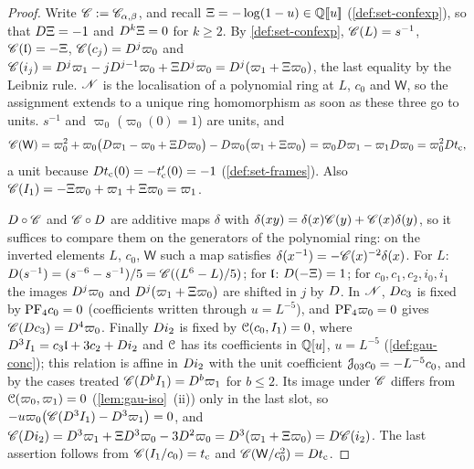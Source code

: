 \begin{proof}
Write $\mathscr{C}:=\mathscr{C}_{\alpha,\beta}$, and recall $\Xi=-\log(1-u)\in\mathbb{Q}[\![ u ]\!]$ (\cref{def:set-confexp}), so that $D\Xi=-1$ and $D^k\Xi=0$ for $k\geq2$. By \cref{def:set-confexp}, $\mathscr{C}(L)=s^{-1}$, $\mathscr{C}(\mathfrak{l})=-\Xi$, $\mathscr{C}(c_j)=D^j\varpi_0$ and $\mathscr{C}(i_j)=D^j\varpi_1-jD^{j-1}\varpi_0+\Xi D^j\varpi_0=D^j(\varpi_1+\Xi\varpi_0)$, the last equality by the Leibniz rule. $\mathscr{N}$ is the localisation of a polynomial ring at $L$, $c_0$ and $\mathsf W$, so the assignment extends to a unique ring homomorphism as soon as these three go to units. $s^{-1}$ and $\varpi_0$ ($\varpi_0(0)=1$) are units, and
\[
\mathscr{C}(\mathsf W)=\varpi_0^2+\varpi_0\bigl(D\varpi_1-\varpi_0+\Xi D\varpi_0\bigr)-D\varpi_0\bigl(\varpi_1+\Xi\varpi_0\bigr)=\varpi_0D\varpi_1-\varpi_1D\varpi_0=\varpi_0^2Dt_{\mathrm{c}},
\]
a unit because $Dt_{\mathrm{c}}(0)=-t_{\mathrm{c}}'(0)=-1$ (\cref{def:set-frames}). Also $\mathscr{C}(I_1)=-\Xi\varpi_0+\varpi_1+\Xi\varpi_0=\varpi_1$.

$D\circ\mathscr{C}$ and $\mathscr{C}\circ D$ are additive maps $\delta$ with $\delta(xy)=\delta(x)\mathscr{C}(y)+\mathscr{C}(x)\delta(y)$, so it suffices to compare them on the generators of the polynomial ring: on the inverted elements $L$, $c_0$, $\mathsf W$ such a map satisfies $\delta(x^{-1})=-\mathscr{C}(x)^{-2}\delta(x)$. For $L$: $D(s^{-1})=(s^{-6}-s^{-1})/5=\mathscr{C}((L^6-L)/5)$; for $\mathfrak{l}$: $D(-\Xi)=1$; for $c_0,c_1,c_2,i_0,i_1$ the images $D^j\varpi_0$ and $D^j(\varpi_1+\Xi\varpi_0)$ are shifted in $j$ by $D$. In $\mathscr{N}$, $D c_3$ is fixed by $\mathrm{PF}_{4} c_0=0$ (coefficients written through $u=L^{-5}$), and $\mathrm{PF}_{4}\varpi_0=0$ gives $\mathscr{C}(D c_3)=D^4\varpi_0$. Finally $D i_2$ is fixed by $\mathcal{C}(c_0,I_1)=0$, where $D^3I_1=c_3\mathfrak{l}+3c_2+D i_2$ and $\mathcal{C}$ has its coefficients in $\mathbb{Q}[u]$, $u=L^{-5}$ (\cref{def:gau-conc}); this relation is affine in $D i_2$ with the unit coefficient $\mathcal{J}_{03}c_0=-L^{-5}c_0$, and by the cases treated $\mathscr{C}(D^bI_1)=D^b\varpi_1$ for $b\leq2$. Its image under $\mathscr{C}$ differs from $\mathcal{C}(\varpi_0,\varpi_1)=0$ (\cref{lem:gau-iso}~(ii)) only in the last slot, so $-u\varpi_0\bigl(\mathscr{C}(D^3I_1)-D^3\varpi_1\bigr)=0$, and $\mathscr{C}(D i_2)=D^3\varpi_1+\Xi D^3\varpi_0-3D^2\varpi_0=D^3(\varpi_1+\Xi\varpi_0)=D\mathscr{C}(i_2)$. The last assertion follows from $\mathscr{C}(I_1/c_0)=t_{\mathrm{c}}$ and $\mathscr{C}(\mathsf W/c_0^2)=Dt_{\mathrm{c}}$.
\end{proof}

